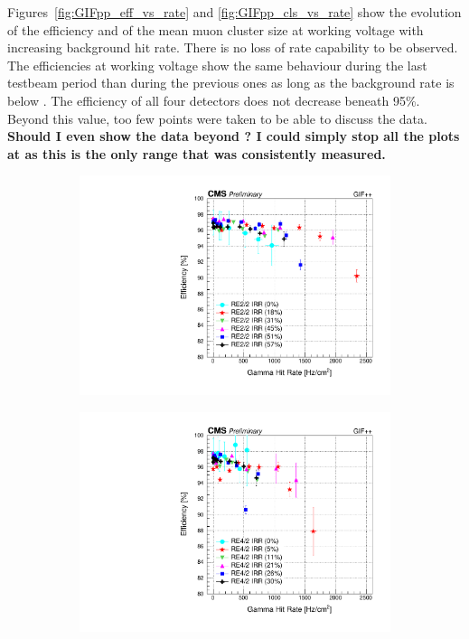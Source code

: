 	Figures~\ref{fig:GIFpp_eff_vs_rate} and \ref{fig:GIFpp_cls_vs_rate} show the evolution of the efficiency and of the mean muon cluster size at working voltage with increasing background hit rate. There is no loss of rate capability to be observed. The efficiencies at working voltage show the same behaviour during the last testbeam period than during the previous ones as long as the background rate is below . The efficiency of all four detectors does not decrease beneath 95\%. Beyond this value, too few points were taken to be able to discuss the data. \textbf{Should I even show the data beyond ? I could simply stop all the plots at  as this is the only range that was consistently measured.}
	
	\begin{figure}[H]
    	\begin{subfigure}{0.5\linewidth}
			\centering
    		\includegraphics[width = \linewidth]{fig/chapt5/RE2-2_IRR_Efficiency_vs_Rate.pdf}
        	\caption{\label{fig:GIFpp_eff_vs_rate:A}}
    	\end{subfigure}
    	\begin{subfigure}{0.5\linewidth}
			\centering
    		\includegraphics[width = \linewidth]{fig/chapt5/RE4-2_IRR_Efficiency_vs_Rate.pdf}

\end{subfigure}
\end{figure}
